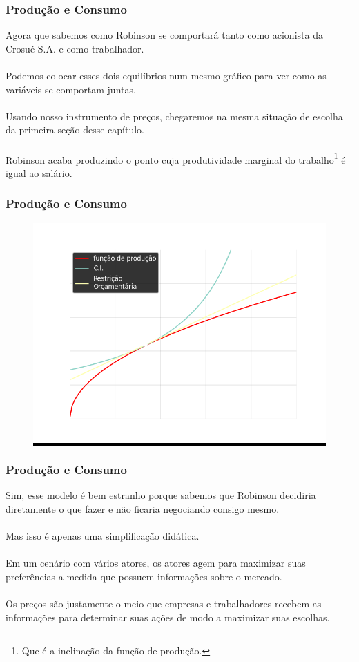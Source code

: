 \documentclass{beamer}[10]
\begin{document}
\begin{frame}
	\frametitle{Produção e Consumo}

	Agora que sabemos como Robinson se comportará tanto como acionista da Crosué S.A. e como trabalhador.
	\\~\\
	Podemos colocar esses dois equilíbrios num mesmo gráfico para ver como as variáveis se comportam juntas.
	\\~\\
	Usando nosso instrumento de preços, chegaremos na mesma situação de escolha da primeira seção desse capítulo.
	\\~\\
	Robinson acaba produzindo o ponto cuja produtividade marginal do trabalho\footnote{Que é a inclinação da função de produção.} é igual ao salário.

\end{frame}

\begin{frame}
	\frametitle{Produção e Consumo}

	\begin{figure}[H]
		\centering
		\colorbox{black}{\includegraphics[scale=0.6]{cap33_5-equilibrio.png}}
	\end{figure}

\end{frame}

\begin{frame}
	\frametitle{Produção e Consumo}

	Sim, esse modelo é bem estranho porque sabemos que Robinson decidiria diretamente o que fazer e não ficaria negociando consigo mesmo.
	\\~\\
	Mas isso é apenas uma simplificação didática.
	\\~\\
	Em um cenário com vários atores, os atores agem para maximizar suas preferências a medida que possuem informações sobre o mercado.
	\\~\\
	Os preços são justamente o meio que empresas e trabalhadores recebem as informações para determinar suas ações de modo a maximizar suas escolhas.

\end{frame}
\end{document}
